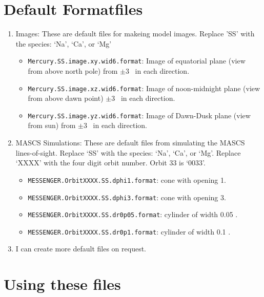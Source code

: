 \documentclass[11pt]{article}
\begin{document}
\section{Default Formatfiles}
\begin{enumerate}
\item Images: These are default files for makeing model images. Replace 'SS' with the 
species: `Na', `Ca', or `Mg'
  \begin{itemize}
  \item \texttt{Mercury.SS.image.xy.wid6.format}: Image of equatorial plane (view from 
  above north pole) from $\pm3$ \Rmerc\ in each direction.
  \item \texttt{Mercury.SS.image.xz.wid6.format}: Image of noon-midnight plane (view 
  from above dawn point) $\pm3$ \Rmerc\ in each direction.
  \item \texttt{Mercury.SS.image.yz.wid6.format}: Image of Dawn-Dusk plane (view from
  sun) from $\pm3$ \Rmerc\ in each direction.
  \end{itemize}

\item MASCS Simulations: These are default files from simulating the MASCS 
lines-of-sight. Replace `SS' with the species: `Na', `Ca', or `Mg'. Replace `XXXX' with
the four digit orbit number. Orbit 33 is `0033'.
  \begin{itemize}
  \item \texttt{MESSENGER.OrbitXXXX.SS.dphi1.format}: cone with opening 1\degr.
  \item \texttt{MESSENGER.OrbitXXXX.SS.dphi3.format}: cone with opening 3\degr.
  \item \texttt{MESSENGER.OrbitXXXX.SS.dr0p05.format}: cylinder of width 0.05 \Rmerc.
  \item \texttt{MESSENGER.OrbitXXXX.SS.dr0p1.format}: cylinder of width 0.1 \Rmerc.
  \end{itemize}

\item I can create more default files on request.
\end{enumerate}

\section{Using these files}
\end{document}
